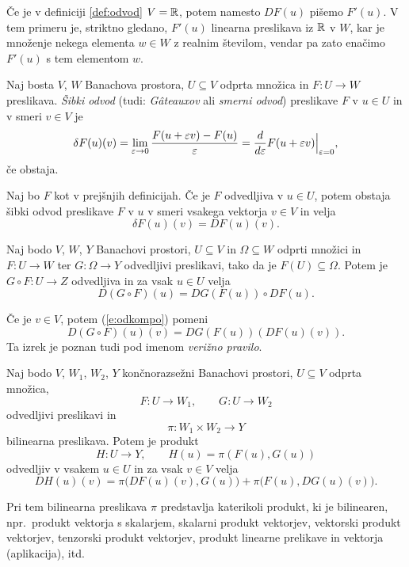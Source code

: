 Če je v definiciji \ref{def:odvod} $V=\mathbb R$, potem namesto $DF(u)$ pišemo $F'(u)$.
V tem primeru je, striktno gledano, $F'(u)$ linearna preslikava iz $\mathbb R$ v $W$, kar je
množenje nekega elementa $w\in W$ z realnim številom, vendar pa zato
enačimo $F'(u)$ s tem elementom $w$.

\begin{definicija}
	Naj bosta $V$, $W$ Banachova prostora, $U\subseteq V$ odprta
	množica in $F\colon U\to W$ preslikava. \emph{Šibki odvod} (tudi: \emph{Gâteauxov} ali
	\emph{smerni odvod}) preslikave $F$ v $u\in U$ in v smeri $v\in V$ je
	\begin{equation*} %
		\delta F(u)(v) =
		\lim_{\varepsilon\to 0}\frac{F(u+\varepsilon v)-F(u)}{\varepsilon}
		=\at{\frac{d}{d\varepsilon}F(u+\varepsilon v)}{\varepsilon = 0},
	\end{equation*}
	če obstaja.
\end{definicija}

\begin{trditev}
	Naj bo $F$ kot v prejšnjih definicijah. Če je $F$ odvedljiva v $u\in U$,
	potem obstaja šibki odvod preslikave $F$ v $u$ v smeri vsakega vektorja $v\in V$
	in velja
	\[
		\delta F(u)(v)=DF(u)(v).
	\]
\end{trditev}

\begin{izrek}
	Naj bodo $V$, $W$, $Y$ Banachovi prostori, $U\subseteq V$ in $\Omega\subseteq W$ odprti
	množici in $F\colon U\to W$ ter $G\colon\Omega\to Y$ odvedljivi preslikavi,
	tako da je $F(U)\subseteq\Omega$.
	Potem je $G\circ F\colon U\to Z$ odvedljiva in za vsak $u\in U$ velja
	\begin{equation} \label{e:odkompo}
		D(G\circ F)(u)=DG(F(u))\circ DF(u).
	\end{equation}
\end{izrek}
Če je $v\in V$, potem (\ref{e:odkompo}) pomeni
\[
	D(G\circ F)(u)(v)=DG(F(u))(DF(u)(v)).
\]
Ta izrek je poznan tudi pod imenom \emph{verižno pravilo}.

\begin{izrek}
	Naj bodo $V$, $W_1$, $W_2$, $Y$ \textcolor[rgb]{1,0,0}{končnorazsežni} Banachovi prostori,
	$U\subseteq V$ odprta množica,
	\[
		F\colon U\to W_1,\qquad G\colon U\to W_2
	\]
	odvedljivi preslikavi in
	\[ \pi\colon W_1\times W_2\to Y \]
	bilinearna preslikava. Potem je produkt
	\[
		H\colon U\to Y, \qquad H(u)=\pi(F(u),G(u))
	\]
	odvedljiv v vsakem $u\in U$ in za vsak $v\in V$ velja
	\[
		DH(u)(v)=\pi\big(DF(u)(v),G(u)\big)+\pi\big(F(u),DG(u)(v)\big).
	\]
\end{izrek}
Pri tem bilinearna preslikava $\pi$ predstavlja katerikoli produkt, ki je bilinearen,
npr.~produkt vektorja s skalarjem, skalarni produkt vektorjev, vektorski produkt vektorjev,
tenzorski produkt vektorjev, produkt linearne prelikave in vektorja (aplikacija), itd.

